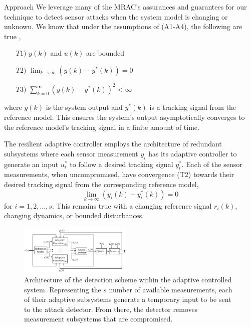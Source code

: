 \begin{section}{Approach}
We leverage many of the MRAC's assurances and guarantees for our technique to detect sensor attacks when the system model is changing or unknown. We know that under the assumptions of (A1-A4), the following are true \cite{tao2003adaptive},
	\begin{enumerate}[label=(\roman*),leftmargin=3\parindent]
	\label{assumtions_ensure}
	\item[$T1)$] $y(k)$ and $u(k)$ are bounded 
	\item[$T2)$] $\lim_{k\to\infty}(y(k)-y^*(k))=0$
	\label{Truth2}
	\item[$T3)$] $\sum_{k=0}^\infty(y(k)-y^*(k))^2<\infty$
	\end{enumerate}
where $y(k)$ is the system output and $y^*(k)$ is a tracking signal from the reference model. This ensures the system's output asymptotically converges to the reference model's tracking signal in a finite amount of time. 


The resilient adaptive controller employs the architecture of redundant subsystems where each sensor measurement $y_i$ has its adaptive controller to generate an input $u^*_i$ to follow a desired tracking signal $y^*_i$. Each of the sensor measurements, when uncompromised, have convergence (T2) towards their desired tracking signal from the corresponding reference model,
    \begin{equation}
    \label{multiple_output_tracking}
    \lim_{k\to\infty}(y_i(k)-y^*_i(k))=0
    \end{equation}
for $i=1,2,\dots,s$. This remains true with a changing reference signal $r_i(k)$, changing dynamics, or bounded disturbances. 

\begin{figure}[ht!]
\vspace{1pt}
\centering
\includegraphics[width=0.48\textwidth]{con_and_det.png}
\caption{Architecture of the detection scheme within the adaptive controlled system. Representing  the $s$ number of available measurements, each of their adaptive subsystems generate a temporary input to be sent to the attack detector. From there, the detector removes measurement subsystems that are compromised.}
\label{fig:det_arch}
\end{figure}


\end{section}
